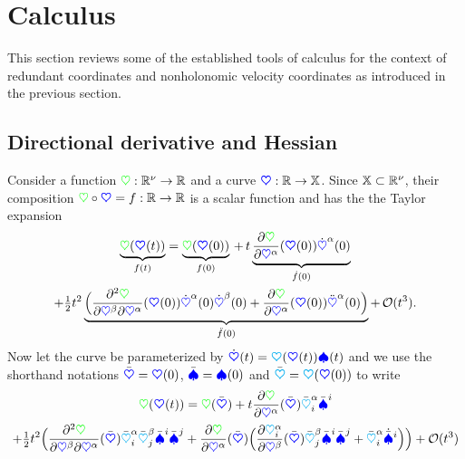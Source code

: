 \section{Calculus}
This section reviews some of the established tools of calculus for the context of redundant coordinates and nonholonomic velocity coordinates as introduced in the previous section.

\subsection{Directional derivative and Hessian}
Consider a function $\potentialEnergy : \RealNum^{\numCoord} \rightarrow \RealNum$ and a curve $\sysCoord : \RealNum \rightarrow \configSpace$.
Since $\configSpace \subset \RealNum^{\numCoord}$, their composition $\potentialEnergy \circ \sysCoord = f : \RealNum \rightarrow \RealNum$ is a scalar function and has the the Taylor expansion
\begin{multline}
 \underbrace{\potentialEnergy(\sysCoord(t))}_{f(t)}
 = \underbrace{\potentialEnergy(\sysCoord(0))}_{f(0)}
  \, + \, t \underbrace{\pdiff[\potentialEnergy]{\sysCoordCoeff{\GidxI}}(\sysCoord(0)) \sysCoordCoeffd{\GidxI}(0)}_{\dot{f}(0)}
 \\
  + \tfrac{1}{2} t^2 \underbrace{\Big( \frac{\partial^2 \potentialEnergy}{\partial\sysCoordCoeff{\GidxII} \partial\sysCoordCoeff{\GidxI}}(\sysCoord(0)) \sysCoordCoeffd{\GidxI}(0) \sysCoordCoeffd{\GidxII}(0) + \pdiff[\potentialEnergy]{\sysCoordCoeff{\GidxI}}(\sysCoord(0)) \sysCoordCoeffdd{\GidxI}(0)\Big)}_{\ddot{f}(0)}
  + \, \mathcal{O}(t^3).
\end{multline}
Now let the curve be parameterized by $\sysCoordd(t) = \kinMat(\sysCoord(t))\sysVel(t)$ and we use the shorthand notations $\sysCoordB = \sysCoord(0)$, $\sysVelB = \sysVel(0)$ and $\kinMatB = \kinMat(\sysCoord(0))$ to write
\begin{multline}
 \potentialEnergy(\sysCoord(t))
 = \potentialEnergy(\sysCoordB)
  + t \pdiff[\potentialEnergy]{\sysCoordCoeff{\GidxI}}(\sysCoordB) \kinMatCoeffB{\GidxI}{\LidxI} \sysVelCoeffB{\LidxI}
\\
  + \tfrac{1}{2} t^2 \Big( \frac{\partial^2 \potentialEnergy}{\partial\sysCoordCoeff{\GidxII} \partial\sysCoordCoeff{\GidxI}}(\sysCoordB) \kinMatCoeffB{\GidxI}{\LidxI} \kinMatCoeffB{\GidxII}{\LidxII} \sysVelCoeffB{\LidxI} \sysVelCoeffB{\LidxII} + \pdiff[\potentialEnergy]{\sysCoordCoeff{\GidxI}}(\sysCoordB) \Big( \pdiff[\kinMatCoeff{\GidxI}{\LidxI}]{\sysCoordCoeff{\GidxII}}(\sysCoordB) \kinMatCoeffB{\GidxII}{\LidxII} \sysVelCoeffB{\LidxI}\sysVelCoeffB{\LidxII} + \kinMatCoeffB{\GidxI}{\LidxI} \sysVelCoeffBd{\LidxI}\Big) \Big)
  + \mathcal{O}(t^3)
\end{multline}

